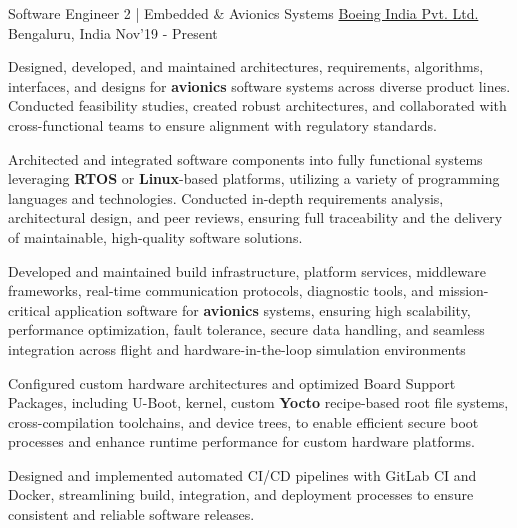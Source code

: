 \begin{cventries}
	\cventry
	{\large Software Engineer 2 | Embedded \& Avionics Systems}
	{\href{https://www.boeing.co.in/}{\large Boeing India Pvt. Ltd.}}
	{\large Bengaluru, India}
	{\large Nov'19 - Present}
	{
		\begin{cvitems}
		\item{\large Designed, developed, and maintained architectures, requirements, algorithms, interfaces, and designs for \textbf{avionics} software systems across diverse product lines. Conducted feasibility studies, created robust architectures, and collaborated with cross-functional teams to ensure alignment with regulatory standards.}
		\item{\large Architected and integrated software components into fully functional systems leveraging \textbf{RTOS} or \textbf{Linux}-based platforms, utilizing a variety of programming languages and technologies. Conducted in-depth requirements analysis, architectural design, and peer reviews, ensuring full traceability and the delivery of maintainable, high-quality software solutions.}
		\item{\large Developed and maintained build infrastructure, platform services, middleware frameworks, real-time communication protocols, diagnostic tools, and mission-critical application software for \textbf{avionics} systems, ensuring high scalability, performance optimization, fault tolerance, secure data handling, and seamless integration across flight and hardware-in-the-loop simulation environments}
		\item{\large Configured custom hardware architectures and optimized Board Support Packages, including U-Boot, kernel, custom \textbf{Yocto} recipe-based root file systems, cross-compilation toolchains, and device trees, to enable efficient secure boot processes and enhance runtime performance for custom hardware platforms.}
		\item{\large Designed and implemented automated CI/CD pipelines with GitLab CI and Docker, streamlining build, integration, and deployment processes to ensure consistent and reliable software releases.}
		\end{cvitems}
	}


\end{cventries}
